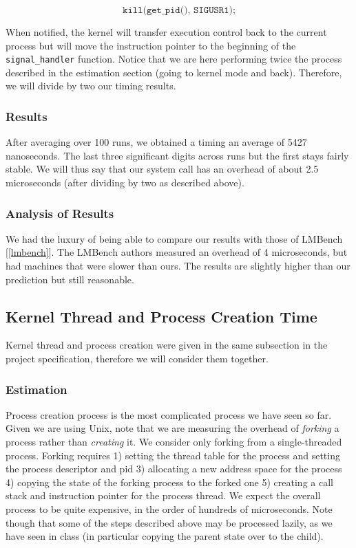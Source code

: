 $$ \texttt{kill(get\_pid(), SIGUSR1);}$$

When notified, the kernel will transfer execution control back to the current process
but will move the instruction pointer to the beginning of the \texttt{signal\_handler} function.
Notice that we are here performing twice the process described in the estimation section
(going to kernel mode and back). Therefore, we will divide by two our timing results.

\subsubsection{Results}

After averaging over 100 runs, we obtained a timing an average of 5427 nanoseconds.
The last three significant digits across runs but the first stays fairly stable. We will thus
say that our system call has an overhead of about 2.5 microseconds (after dividing by 
two as described above). 

\subsubsection{Analysis of Results}

We had the luxury of being able to compare our results with those of LMBench [\ref{lmbench}].
The LMBench authors measured an overhead of 4 microseconds, but had machines that
were slower than ours. The results are slightly higher than our prediction but still reasonable.

\subsection{Kernel Thread and Process Creation Time}

Kernel thread and process creation were given in the same subsection in the project
specification, therefore we will consider them together.

\subsubsection{Estimation}

Process creation process is the most complicated process we have seen so far. Given we are
using Unix, note that we are measuring the overhead of \emph{forking} a process rather than
\emph{creating} it. We consider only forking from a single-threaded process. Forking requires 1) setting the thread table for the
process and setting the process descriptor and pid 3) allocating a new address space for the process
4) copying the state of the forking process to the forked one 5) creating a call stack and instruction pointer 
for the process thread. We expect the overall process to be quite expensive, in the order of hundreds of 
microseconds. Note though that some of the steps described above may be processed lazily, as we have 
seen in class (in particular copying the parent state over to the child). 

